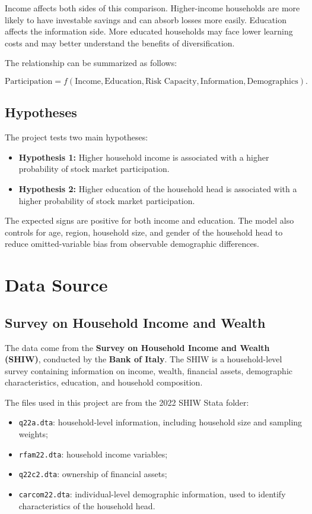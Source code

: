 \documentclass[12pt]{article}
\begin{document}
Income affects both sides of this comparison. Higher-income households are more likely to have investable savings and can absorb losses more easily. Education affects the information side. More educated households may face lower learning costs and may better understand the benefits of diversification.

The relationship can be summarized as follows:

\[
\text{Participation} =
f(\text{Income}, \text{Education}, \text{Risk Capacity}, \text{Information}, \text{Demographics}).
\]

\subsection{Hypotheses}

The project tests two main hypotheses:

\begin{itemize}[leftmargin=*]
    \item \textbf{Hypothesis 1:} Higher household income is associated with a higher probability of stock market participation.
    \item \textbf{Hypothesis 2:} Higher education of the household head is associated with a higher probability of stock market participation.
\end{itemize}

The expected signs are positive for both income and education. The model also controls for age, region, household size, and gender of the household head to reduce omitted-variable bias from observable demographic differences.

\section{Data Source}

\subsection{Survey on Household Income and Wealth}

The data come from the \textbf{Survey on Household Income and Wealth (SHIW)}, conducted by the \textbf{Bank of Italy}. The SHIW is a household-level survey containing information on income, wealth, financial assets, demographic characteristics, education, and household composition.

The files used in this project are from the 2022 SHIW Stata folder:

\begin{itemize}[leftmargin=*]
    \item \texttt{q22a.dta}: household-level information, including household size and sampling weights;
    \item \texttt{rfam22.dta}: household income variables;
    \item \texttt{q22c2.dta}: ownership of financial assets;
    \item \texttt{carcom22.dta}: individual-level demographic information, used to identify characteristics of the household head.
\end{itemize}
\end{document}
